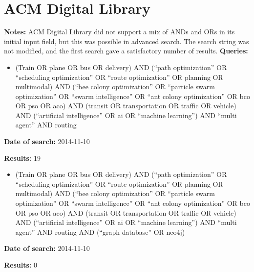 \section{ACM Digital Library}
\textbf{Notes:} ACM Digital Library did not support a mix of ANDs and ORs in its initial input field, but this was possible in advanced search. The search string was not modified, and the first search gave a satisfactory number of results. 
\newline
\newline
\textbf{Queries:}
\begin{itemize}
\item (Train OR plane OR bus OR delivery) AND (``path optimization'' OR ``scheduling optimization'' OR ``route optimization'' OR planning OR multimodal) AND (``bee colony optimization'' OR ``particle swarm optimization'' OR ``swarm intelligence'' OR ``ant colony optimization'' OR bco OR pso OR aco) AND (transit OR transportation OR traffic OR vehicle) AND (``artificial intelligence'' OR ai OR ``machine learning'') AND ``multi agent'' AND routing
\end{itemize}
\par \textbf{Date of search:} 2014-11-10 
\par \textbf{Results:} 19
\begin{itemize}
\item (Train OR plane OR bus OR delivery) AND (``path optimization'' OR ``scheduling optimization'' OR ``route optimization'' OR planning OR multimodal) AND (``bee colony optimization'' OR ``particle swarm optimization'' OR ``swarm intelligence'' OR ``ant colony optimization'' OR bco OR pso OR aco) AND (transit OR transportation OR traffic OR vehicle) AND (``artificial intelligence'' OR ai OR ``machine learning'') AND ``multi agent'' AND routing AND (``graph database'' OR neo4j)
\end{itemize}
\par \textbf{Date of search:} 2014-11-10 
\par \textbf{Results:} 0


